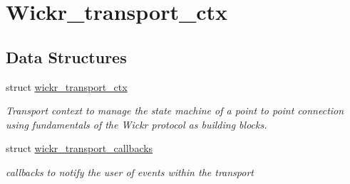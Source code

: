\hypertarget{group__wickr__transport__ctx}{}\section{Wickr\+\_\+transport\+\_\+ctx}
\label{group__wickr__transport__ctx}
\subsection*{Data Structures}
\begin{DoxyCompactItemize}
\item 
struct \hyperlink{structwickr__transport__ctx}{wickr\+\_\+transport\+\_\+ctx}
\begin{DoxyCompactList}\small\item\em Transport context to manage the state machine of a point to point connection using fundamentals of the Wickr protocol as building blocks. \end{DoxyCompactList}\item 
struct \hyperlink{structwickr__transport__callbacks}{wickr\+\_\+transport\+\_\+callbacks}
\begin{DoxyCompactList}\small\item\em callbacks to notify the user of events within the transport \end{DoxyCompactList}\end{DoxyCompactItemize}

